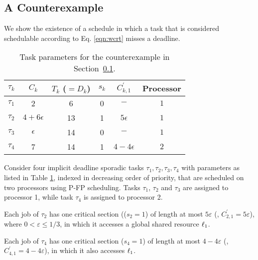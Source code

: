\subsection{A Counterexample}
\label{sec:counterexample}

We show the existence of a schedule in which a task that is considered schedulable according to Eq. \eqref{eqn:wcrt} misses a deadline.

%

\begin{table}[t]
\centering
    \begin{tabular}{|c|c|c|c|c|c|} 
 \hline
        $\tau_k$ & $C_k$ & $T_k$ ($= D_k$) & $s_k$ & $C_{k,1}^{\prime}$ & Processor\\
        \hline
        $\tau_1$ & 2             & 6  & 0 & $-$ & $1$\\ 
        $\tau_2$ & $4+6\epsilon$ & 13 & 1 & $5\epsilon$& $1$\\
        $\tau_3$ & $\epsilon$    & 14 & 0 & $-$ & $1$\\
        $\tau_4$ & 7             & 14 & 1 & $4-4\epsilon$ & $2$\\ 
        \hline
    \end{tabular}
    \caption{Task parameters for the counterexample in Section~\ref{sec:counterexample}.}
    \label{table:parameters}
\end{table}

Consider four implicit deadline sporadic tasks ${\tau_1, \tau_2, \tau_3, \tau_4}$ with parameters as listed in Table \ref{table:parameters}, indexed in decreasing order of priority, that are scheduled on two processors using P-FP scheduling. Tasks $\tau_1$, $\tau_2$ and $\tau_3$ are assigned to processor 1, while task $\tau_4$ is assigned to processor 2.

Each job of $\tau_2$ has one critical section (($s_2 = 1$) of length at most $5\varepsilon$ (\ie, $C_{2,1}^{\prime} = 5\varepsilon$), where $0 < \varepsilon \leq 1/3$, in which it accesses a global shared resource $\ell_1$.

Each job of $\tau_4$ has one critical section ($s_4 = 1$) of length at most $4-4\varepsilon$ (\ie, $C_{4,1}^{\prime} = 4-4\varepsilon$), in which it also accesses $\ell_1$.

